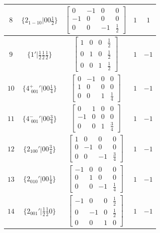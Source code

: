 \documentclass[fleqn,8pt]{jsarticle}
\begin{document}
\begin{longtable}{ccccc}
$ 8 $ & $ \{2{}_{1-10}|0 0 \frac{1}{2}\} $ & $ \begin{bmatrix} 0 & -1 & 0 & 0 \\ -1 & 0 & 0 & 0 \\ 0 & 0 & -1 & \frac{1}{2} \end{bmatrix} $ & $ 1 $ & $ 1 $ \\ \hline
$ 9 $ & $ \{1{}'|\frac{1}{2} \frac{1}{2} \frac{1}{2}\} $ & $ \begin{bmatrix} 1 & 0 & 0 & \frac{1}{2} \\ 0 & 1 & 0 & \frac{1}{2} \\ 0 & 0 & 1 & \frac{1}{2} \end{bmatrix} $ & $ 1 $ & $ -1 $ \\ \hline
$ 10 $ & $ \{4^{+}_{\,\,001}{}'|0 0 \frac{1}{4}\} $ & $ \begin{bmatrix} 0 & -1 & 0 & 0 \\ 1 & 0 & 0 & 0 \\ 0 & 0 & 1 & \frac{1}{4} \end{bmatrix} $ & $ 1 $ & $ -1 $ \\ \hline
$ 11 $ & $ \{4^{-}_{\,\,001}{}'|0 0 \frac{3}{4}\} $ & $ \begin{bmatrix} 0 & 1 & 0 & 0 \\ -1 & 0 & 0 & 0 \\ 0 & 0 & 1 & \frac{3}{4} \end{bmatrix} $ & $ 1 $ & $ -1 $ \\ \hline
$ 12 $ & $ \{2{}_{100}{}'|0 0 \frac{3}{4}\} $ & $ \begin{bmatrix} 1 & 0 & 0 & 0 \\ 0 & -1 & 0 & 0 \\ 0 & 0 & -1 & \frac{3}{4} \end{bmatrix} $ & $ 1 $ & $ -1 $ \\ \hline
$ 13 $ & $ \{2{}_{010}{}'|0 0 \frac{1}{4}\} $ & $ \begin{bmatrix} -1 & 0 & 0 & 0 \\ 0 & 1 & 0 & 0 \\ 0 & 0 & -1 & \frac{1}{4} \end{bmatrix} $ & $ 1 $ & $ -1 $ \\ \hline
$ 14 $ & $ \{2{}_{001}{}'|\frac{1}{2} \frac{1}{2} 0\} $ & $ \begin{bmatrix} -1 & 0 & 0 & \frac{1}{2} \\ 0 & -1 & 0 & \frac{1}{2} \\ 0 & 0 & 1 & 0 \end{bmatrix} $ & $ 1 $ & $ -1 $ \\ \hline

\end{longtable}
\end{document}
